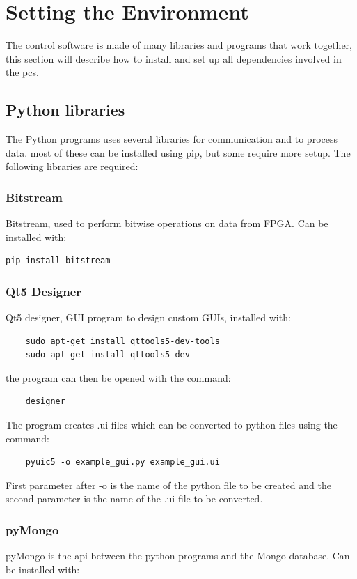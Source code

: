 \documentclass[main.tex]{subfiles}
\begin{document}
\section{Setting the Environment}

The control software is made of many libraries and programs that work together, this section will describe how to install and set up all dependencies involved in the \gls{pcs}.

\subsection{Python libraries}

The Python programs uses several libraries for communication and to process data. most of these can be installed using pip, but some require more setup. The following libraries are required:
\subsubsection{Bitstream}
Bitstream, used to perform bitwise operations on data from FPGA. Can be installed with:
\begin{verbatim}
pip install bitstream    
\end{verbatim}

\subsubsection{Qt5 Designer}
Qt5 designer, GUI program to design custom GUIs, installed with:

\begin{verbatim}
    sudo apt-get install qttools5-dev-tools
    sudo apt-get install qttools5-dev
\end{verbatim}
the program can then be opened with the command:
\begin{verbatim}
    designer
\end{verbatim}

The program creates .ui files which can be converted to python files using the command:

\begin{verbatim}
    pyuic5 -o example_gui.py example_gui.ui
\end{verbatim}

First parameter after -o is the name of the python file to be created and the second parameter is the name of the .ui file to be converted.

\subsubsection{pyMongo}
pyMongo is the \gls{api} between the python programs and the Mongo database. Can be installed with:
\end{document}
